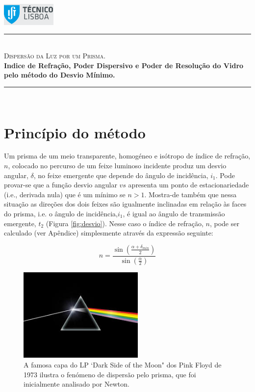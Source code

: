 \documentclass[a4paper,12pt]{article}  %
\author{Prof. Bernardo B. Carvalho}
\date{ Outubro 2012}
\newcommand{\HRule}{\rule{\linewidth}{0.5mm}}
\begin{document}
 

	\includegraphics[width=0.2\textwidth]{../logo-ist}%

	\HRule \\[0.5cm]
	{ \huge \sf  \textsc{Dispersão da Luz por um Prisma.}} \\[0.4cm] %
	{ \large \bfseries Indice de Refração, Poder Dispersivo e Poder de Resolução do Vidro pelo método do Desvio Mínimo.}\\
	\HRule \\%

\section{\sf Princípio do método}
Um prisma de um meio transparente, homogéneo e isótropo de índice de refração, $n$, colocado no percurso de um feixe luminoso incidente produz um desvio angular, $\delta$, no feixe emergente que depende do ângulo de incidência, $i_1$. Pode provar-se que a função desvio angular $vs$ apresenta um ponto de estacionariedade (i.e., derivada nula) que é um mínimo se $n > 1$. 
Mostra-de também que nessa situação as direções dos dois feixes são igualmente inclinadas em relação às faces do prisma, i.e.  o ângulo de incidência,$i_1$, é igual ao ângulo de transmissão 
emergente, $t_2$ (Figura \ref{fig:desvio}). 
Nesse caso   o índice de refração, $n$, pode ser calculado (ver Apêndice) simplesmente através da expressão seguinte: 

\begin{equation}
	\label{eq:desviomim}
	n= \frac{\sin \left( \frac{\alpha+ \delta_{min}}{2} \right) } {\sin \left(  \frac{\alpha}{2} \right)}  
\end{equation}

\begin{figure}[h!b]  \centering 
	\includegraphics[width=0.55\textwidth]{darkside}
	\caption{A famosa capa do LP `Dark Side of the Moon" dos Pink Floyd de 1973 ilustra  o fenómeno de dispersão pelo prisma, que foi inicialmente  analisado por Newton.\label{fig:darkside}} 
\end{figure}
\end{document}
